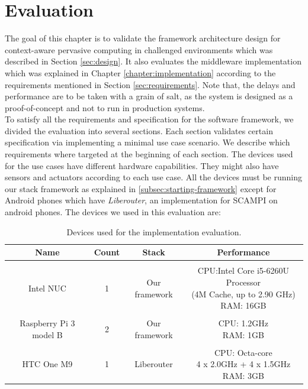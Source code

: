 
\chapter{Evaluation}\label{chapter:Evaluation}

The goal of this chapter is to validate the framework architecture design for context-aware pervasive computing in challenged environments which was described in Section \ref{sec:design}. It also evaluates the middleware implementation which was explained in Chapter \ref{chapter:implementation} according to the requirements mentioned in Section \ref{sec:requirements}. Note that, the delays and performance are to be taken with a grain of salt, as the system is designed as a proof-of-concept and not to run in production systems. \\

\noindent To satisfy all the requirements and specification for the software framework, we divided the evaluation into several sections. Each section validates certain specification via implementing a minimal use case scenario. We describe which requirements where targeted at the beginning of each section. The devices used for  the use cases have different hardware capabilities. They might also have  sensors and actuators according to each use case. All the devices must be running our stack framework as explained in \ref{subsec:starting-framework} except for Android phones which have \textit{Liberouter}, an implementation for SCAMPI on android phones. The devices we used in this evaluation are:
\begin{table}[!ht]
	\centering
	\begin{tabular}{*{4}{c}}\toprule
		Name & Count & Stack & Performance \\ \hline
		 &  &  &  \\
		Intel NUC &1& 	Our framework &   \specialcell[c]{CPU:Intel Core i5-6260U Processor\\ (4M Cache, up to 2.90 GHz)\\RAM: 16GB }\\ 
		&  &  &  \\
		Raspberry Pi 3 model B & 2 & Our framework &  \specialcell[c]{ CPU: 1.2GHz\\RAM: 1GB}  \\ 
		&  &  &  \\
		HTC One M9 & 1 & Liberouter &   \specialcell[c]{CPU: Octa-core \\4 x 2.0GHz + 4 x 1.5GHz\\ RAM: 3GB} \\ \hline

\end{tabular}
\caption{Devices used for the implementation evaluation.}
\label{table:devoces}
\end{table}

